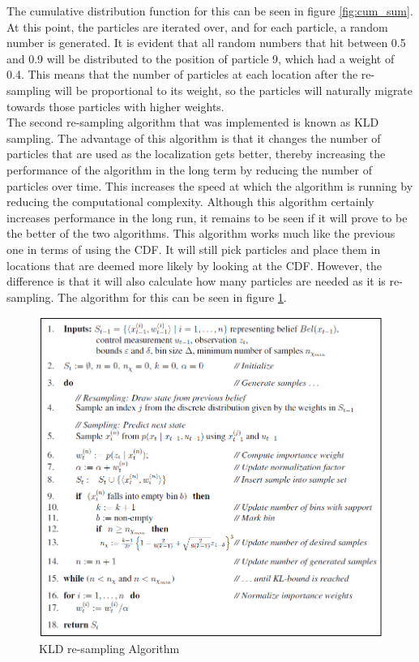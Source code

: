 \documentclass{article}
\begin{document}
The cumulative distribution function for this can be seen in figure \ref{fig:cum_sum}. At this point, the particles are iterated over, and for each particle, a random number is generated. It is evident that all random numbers that hit between 0.5 and 0.9 will be distributed to the position of particle 9, which had a weight of 0.4. This means that the number of particles at each location after the re-sampling will be proportional to its weight, so the particles will naturally migrate towards those particles with higher weights.\\

The second re-sampling algorithm that was implemented is known as KLD sampling. The advantage of this algorithm is that it changes the number of particles that are used as the localization gets better, thereby increasing the performance of the algorithm in the long term by reducing the number of particles over time. This increases the speed at which the algorithm is running by reducing the computational complexity\citep{ProbRob}. Although this algorithm certainly increases performance in the long run, it remains to be seen if it will prove to be the better of the two algorithms. This algorithm works much like the previous one in terms of using the CDF. It will still pick particles and place them in locations that are deemed more likely by looking at the CDF. However, the difference is that it will also calculate how many particles are needed as it is re-sampling\citep{KLD}. The algorithm for this can be seen in figure \ref{fig:KLD_re-sampling}.\\

\begin{figure}[h!]
\centering
\includegraphics[scale=0.4]{KLD_Algo.PNG}
\caption{KLD re-sampling Algorithm}
\label{fig:KLD_re-sampling}
\end{figure}
\end{document}
